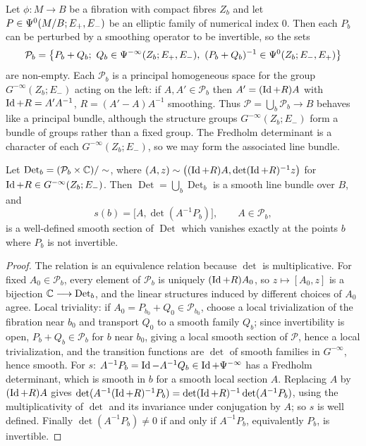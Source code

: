 Let $\phi:M\longrightarrow B$ be a fibration with compact fibres $Z_b$ and let
$P\in\Psi^{0}(M/B;E_+,E_-)$ be an elliptic family of numerical index $0$. Then each
$P_b$ can be perturbed by a smoothing operator to be invertible, so the sets
\[
\mathcal P_b=\bigl\{P_b+Q_b;\ Q_b\in\Psido{-\infty}(Z_b;E_+,E_-),\ (P_b+Q_b)^{-1}\in
\Psido{0}(Z_b;E_-,E_+)\bigr\}
\]
are non-empty. Each $\mathcal P_b$ is a principal homogeneous space for the group
$G^{-\infty}(Z_b;E_-)$ acting on the left: if $A,A'\in\mathcal P_b$ then
$A'=(\operatorname{Id}+R)A$ with $\operatorname{Id}+R=A'A^{-1}$, $R=(A'-A)A^{-1}$ smoothing. Thus
$\mathcal P=\bigcup_b\mathcal P_b\longrightarrow B$ behaves like a principal bundle, although
the structure groups $G^{-\infty}(Z_b;E_-)$ form a bundle of groups rather than a fixed
group. The Fredholm determinant is a character of each $G^{-\infty}(Z_b;E_-)$, so we may form the
associated line bundle.

\begin{proposition}\label{eta:prop:det-bundle}
Let $\operatorname{Det}_b=(\mathcal P_b\times\mathbb{C})/\sim$, where
$(A,z)\sim\bigl((\operatorname{Id}+R)A,\det(\operatorname{Id}+R)^{-1}z\bigr)$ for $\operatorname{Id}+R\in G^{-\infty}(Z_b;E_-)$. Then
$\operatorname{Det}=\bigcup_b\operatorname{Det}_b$ is a smooth line bundle over $B$, and
\[
s(b)=\bigl[A,\det(A^{-1}P_b)\bigr],\qquad A\in\mathcal P_b,
\]
is a well-defined smooth section of $\operatorname{Det}$ which vanishes exactly at the points
$b$ where $P_b$ is not invertible.
\end{proposition}

\begin{proof} The relation is an equivalence relation because $\det$ is multiplicative.
For fixed $A_0\in\mathcal P_b$, every element of $\mathcal P_b$ is uniquely $(\operatorname{Id}+R)A_0$, so
$z\mapsto[A_0,z]$ is a bijection $\mathbb{C}\longrightarrow\operatorname{Det}_b$, and the linear structures
induced by different choices of $A_0$ agree. Local triviality: if $A_0=P_{b_0}+Q_0\in\mathcal
P_{b_0}$, choose a local trivialization of the fibration near $b_0$ and transport $Q_0$ to a
smooth family $Q_b$; since invertibility is open, $P_b+Q_b\in\mathcal P_b$ for $b$ near
$b_0$, giving a local smooth section of $\mathcal P$, hence a local trivialization, and the
transition functions are $\det$ of smooth families in $G^{-\infty}$, hence smooth. For
$s$: $A^{-1}P_b=\operatorname{Id}-A^{-1}Q_b\in\operatorname{Id}+\Psi^{-\infty}$ has a Fredholm determinant, which is
smooth in $b$ for a smooth local section $A$. Replacing $A$ by $(\operatorname{Id}+R)A$ gives
$\det(A^{-1}(\operatorname{Id}+R)^{-1}P_b)=\det(\operatorname{Id}+R)^{-1}\det(A^{-1}P_b)$, using the multiplicativity
of $\det$ and its invariance under conjugation by $A$; so $s$ is well defined.
Finally $\det(A^{-1}P_b)\ne0$ if and only if $A^{-1}P_b$, equivalently $P_b$, is invertible.
\end{proof}

